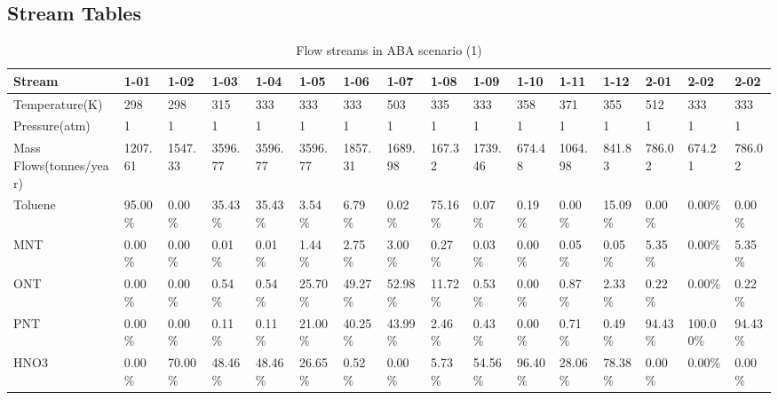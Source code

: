 \begin{landscape}


\section{Stream Tables}
\label{app:drawings}


\begin{table}[H]
\caption{Flow streams in ABA scenario (1)}
\label{ABAFST1}
\begin{tabular}{|l|l|l|l|l|l|l|l|l|l|l|l|l|l|l|l|}
\hline
\textbf{Stream}         & 1-01    & 1-02    & 1-03    & 1-04    & 1-05    & 1-06    & 1-07    & 1-08    & 1-09    & 1-10    & 1-11    & 1-12    & 2-01    & 2-02     & 2-02    \\ \hline
Temperature(K)          & 298     & 298     & 315     & 333     & 333     & 333     & 503     & 335     & 333     & 358     & 371     & 355     & 512     & 333      & 333     \\ \hline
Pressure(atm)           & 1       & 1       & 1       & 1       & 1       & 1       & 1       & 1       & 1       & 1       & 1       & 1       & 1       & 1        & 1       \\ \hline
Mass Flows(tonnes/year) & 1207.61 & 1547.33 & 3596.77 & 3596.77 & 3596.77 & 1857.31 & 1689.98 & 167.32  & 1739.46 & 674.48  & 1064.98 & 841.83  & 786.02  & 674.21   & 786.02  \\ \hline
Toluene                 & 95.00\% & 0.00\%  & 35.43\% & 35.43\% & 3.54\%  & 6.79\%  & 0.02\%  & 75.16\% & 0.07\%  & 0.19\%  & 0.00\%  & 15.09\% & 0.00\%  & 0.00\%   & 0.00\%  \\ \hline
MNT                     & 0.00\%  & 0.00\%  & 0.01\%  & 0.01\%  & 1.44\%  & 2.75\%  & 3.00\%  & 0.27\%  & 0.03\%  & 0.00\%  & 0.05\%  & 0.05\%  & 5.35\%  & 0.00\%   & 5.35\%  \\ \hline
ONT                     & 0.00\%  & 0.00\%  & 0.54\%  & 0.54\%  & 25.70\% & 49.27\% & 52.98\% & 11.72\% & 0.53\%  & 0.00\%  & 0.87\%  & 2.33\%  & 0.22\%  & 0.00\%   & 0.22\%  \\ \hline
PNT                     & 0.00\%  & 0.00\%  & 0.11\%  & 0.11\%  & 21.00\% & 40.25\% & 43.99\% & 2.46\%  & 0.43\%  & 0.00\%  & 0.71\%  & 0.49\%  & 94.43\% & 100.00\% & 94.43\% \\ \hline
HNO3                    & 0.00\%  & 70.00\% & 48.46\% & 48.46\% & 26.65\% & 0.52\%  & 0.00\%  & 5.73\%  & 54.56\% & 96.40\% & 28.06\% & 78.38\% & 0.00\%  & 0.00\%   & 0.00\%  \\ \hline

\end{tabular}
\end{table}
\end{landscape}
